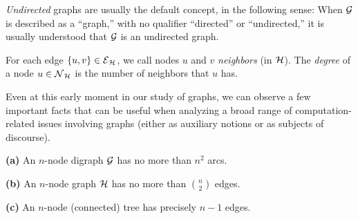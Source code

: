 \medskip

{\em Undirected} graphs are usually the default concept, in the
following sense: When $\mbox{$\cal G$}$ is described as a ``graph,'' with no
qualifier ``directed'' or ``undirected,'' it is usually understood
that $\mbox{$\cal G$}$ is an undirected graph.

\medskip

For each edge $\{u,v\} \in \mbox{$\cal E$}_{\mbox{{\scriptsize $\cal H$}}}$, we call nodes $u$ and $v$ {\it
  neighbors} (in $\mbox{$\cal H$}$).
The {\it degree}
of a node $u \in \mbox{$\cal N$}_{\mbox{{\scriptsize $\cal H$}}}$ is the number of neighbors that $u$ has.

Even at this early moment in our study of graphs, we can observe a few
important facts that can be useful when analyzing a broad range of
computation-related issues involving graphs (either as auxiliary
notions or as subjects of discourse).

\begin{prop}
\label{thm:number-edges/arcs}
{\bf (a)}
An $n$-node digraph $\mbox{$\cal G$}$ has no more than $n^2$ arcs.

{\bf (b)}
An $n$-node graph $\mbox{$\cal H$}$ has no more than $\displaystyle {n \choose 2}$ edges.

{\bf (c)}
An $n$-node (connected) tree has precisely $n-1$ edges.
\end{prop}

